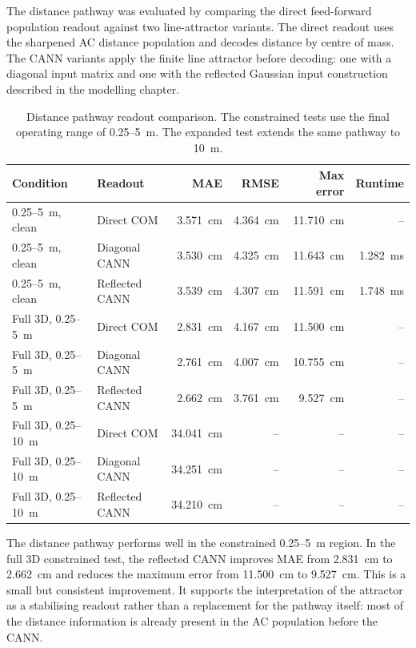 The distance pathway was evaluated by comparing the direct feed-forward population readout against two line-attractor variants. The direct readout uses the sharpened AC distance population and decodes distance by centre of mass. The CANN variants apply the finite line attractor before decoding: one with a diagonal input matrix and one with the reflected Gaussian input construction described in the modelling chapter.

\begin{table}[H]
    \centering
    \caption{Distance pathway readout comparison. The constrained tests use the final operating range of 0.25--5~m. The expanded test extends the same pathway to 10~m.}
    \label{tab:distance_pathway_results}
    \small
    \begin{tabular}{llrrrr}
        \toprule
        Condition & Readout & MAE & RMSE & Max error & Runtime \\
        \midrule
        0.25--5~m, clean & Direct COM & 3.571~cm & 4.364~cm & 11.710~cm & -- \\
        0.25--5~m, clean & Diagonal CANN & 3.530~cm & 4.325~cm & 11.643~cm & 1.282~ms \\
        0.25--5~m, clean & Reflected CANN & 3.539~cm & 4.307~cm & 11.591~cm & 1.748~ms \\
        \midrule
        Full 3D, 0.25--5~m & Direct COM & 2.831~cm & 4.167~cm & 11.500~cm & -- \\
        Full 3D, 0.25--5~m & Diagonal CANN & 2.761~cm & 4.007~cm & 10.755~cm & -- \\
        Full 3D, 0.25--5~m & Reflected CANN & 2.662~cm & 3.761~cm & 9.527~cm & -- \\
        \midrule
        Full 3D, 0.25--10~m & Direct COM & 34.041~cm & -- & -- & -- \\
        Full 3D, 0.25--10~m & Diagonal CANN & 34.251~cm & -- & -- & -- \\
        Full 3D, 0.25--10~m & Reflected CANN & 34.210~cm & -- & -- & -- \\
        \bottomrule
    \end{tabular}
\end{table}

The distance pathway performs well in the constrained 0.25--5~m region. In the full 3D constrained test, the reflected CANN improves MAE from 2.831~cm to 2.662~cm and reduces the maximum error from 11.500~cm to 9.527~cm. This is a small but consistent improvement. It supports the interpretation of the attractor as a stabilising readout rather than a replacement for the pathway itself: most of the distance information is already present in the AC population before the CANN.

